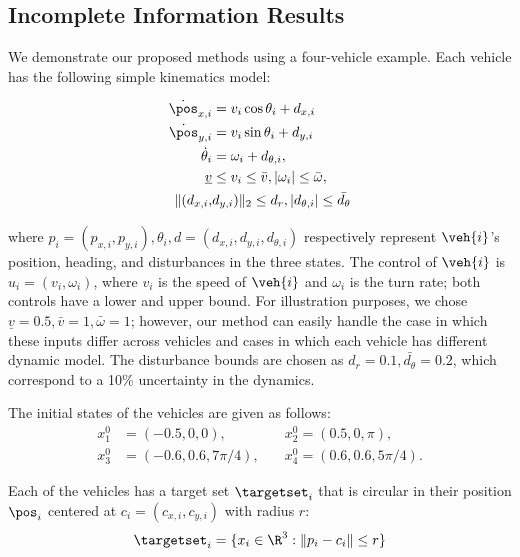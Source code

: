 \subsection{Incomplete Information Results \label{sec:basic_results}}
We demonstrate our proposed methods using a four-vehicle example. Each vehicle has the following simple kinematics model:

\begin{equation}
\label{eq:dyn_i}
\begin{aligned}
\dot{\pos}_{x,i} &= v_i \cos \theta_i + d_{x,i} \\
\dot{\pos}_{y,i} &= v_i \sin \theta_i + d_{y,i}\\
\dot{\theta}_i &= \omega_i + d_{\theta,i}, \\
\underline{v} & \le v_i \le \bar{v}, |\omega_i| \le \bar{\omega},\\
\|(d_{x,i}, & d_{y,i}) \|_2 \le d_{r}, |d_{\theta,i}| \le \bar{d_{\theta}}
\end{aligned}
\end{equation}

\noindent where $p_i = (p_{x,i}, p_{y,i}), \theta_i, d = (d_{x,i}, d_{y,i}, d_{\theta,i})$ respectively represent $\veh{i}$'s position, heading, and disturbances in the three states. The control of $\veh{i}$ is $u_i = (v_i, \omega_i)$, where $v_i$ is the speed of $\veh{i}$ and $\omega_i$ is the turn rate; both controls have a lower and upper bound. For illustration purposes, we chose $\underline{v} = 0.5, \bar{v} = 1, \bar\omega = 1$; however, our method can easily handle the case in which these inputs differ across vehicles and cases in which each vehicle has different dynamic model. The disturbance bounds are chosen as $d_{r} = 0.1, \bar{d_{\theta}} = 0.2$, which correspond to a 10\% uncertainty in the dynamics.

The initial states of the vehicles are given as follows:
\begin{equation}
\begin{aligned}
x_1^0 &= (-0.5, 0, 0), \quad &x_2^0 = (0.5, 0, \pi), \\
x_3^0 &= \left(-0.6, 0.6, 7\pi/4\right), \quad &x_4^0 = \left(0.6, 0.6, 5\pi/4\right).
\end{aligned}
\end{equation}

\noindent Each of the vehicles has a target set $\targetset_i$ that is circular in their position $\pos_i$ centered at $c_i = (c_{x,i}, c_{y,i})$ with radius $r$:
\vspace{-0.2em}
\begin{equation}
\targetset_i = \{x_i \in \R^3: \|p_i - c_i\| \le r\}
\end{equation}

